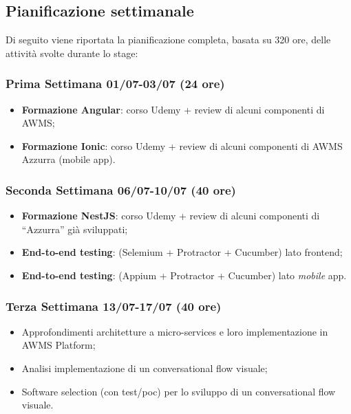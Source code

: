 \subsection{Pianificazione settimanale}
Di seguito viene riportata la pianificazione completa, basata su 320 ore, delle attività svolte durante lo stage:
\begin{trivlist}
	\item \subsubsection{Prima Settimana 01/07-03/07 (24 ore)}   
	\begin{itemize}
		\item \textbf{Formazione Angular}: corso Udemy + review di alcuni componenti di \gls{AWMS};
		\item \textbf{Formazione Ionic}: corso Udemy + review di alcuni componenti di \gls{AWMS} Azzurra (mobile app).
	\end{itemize}  

\item \subsubsection{Seconda Settimana 06/07-10/07 (40 ore)}
\begin{itemize}
	\item \textbf{Formazione NestJS}: corso Udemy + review di alcuni componenti di “Azzurra” già sviluppati;
	\item \textbf{End-to-end testing}: (Selemium + Protractor + Cucumber) lato frontend;
	\item \textbf{End-to-end testing}: (Appium + Protractor + Cucumber) lato \emph{mobile} app.
\end{itemize}

\item \subsubsection{Terza Settimana 13/07-17/07 (40 ore)}
\begin{itemize}
	\item Approfondimenti architetture a micro-services e loro implementazione in \gls{AWMS} Platform;
	\item Analisi implementazione di un conversational flow visuale;
	\item Software selection (con test/poc) per lo sviluppo di un conversational flow visuale.
\end{itemize}	


\end{trivlist}
